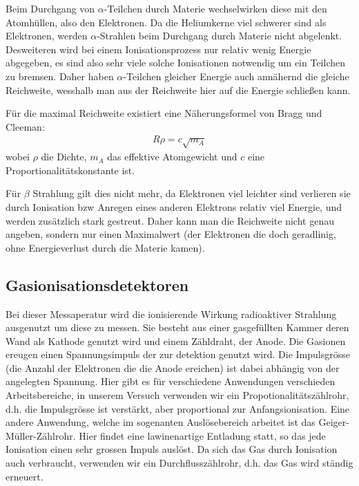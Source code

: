 \documentclass[12pt]{article}
\begin{document}
Beim Durchgang von $\alpha$-Teilchen durch Materie wechselwirken diese mit den Atomhüllen, also den Elektronen. Da die Heliumkerne viel schwerer sind als Elektronen, werden $\alpha$-Strahlen beim Durchgang durch Materie nicht abgelenkt. Desweiteren wird bei einem Ionisationsprozess nur relativ wenig Energie abgegeben, es sind also sehr viele solche Ionisationen notwendig um ein Teilchen zu bremsen. Daher haben $\alpha$-Teilchen gleicher Energie auch annähernd die gleiche Reichweite, wesshalb man aus der Reichweite hier auf die Energie schließen kann. 

Für die maximal Reichweite existiert eine Näherungsformel von Bragg und Cleeman: 
\begin{align}
 \label{cleeman} R \rho=c\sqrt{m_A}
\end{align}
wobei $\rho$ die Dichte, $m_A$ das effektive Atomgewicht und $c$ eine Proportionalitätskonstante ist.

Für $\beta$ Strahlung gilt dies nicht mehr, da Elektronen viel leichter sind verlieren sie durch Ionisation bzw Anregen eines anderen Elektrons relativ viel Energie, und werden zusätzlich stark gestreut. Daher kann man die Reichweite nicht genau angeben, sondern nur einen Maximalwert (der Elektronen die doch geradlinig, ohne Energieverlust durch die Materie kamen).


\subsection{Gasionisationsdetektoren}

Bei dieser Messaperatur wird die ionisierende Wirkung radioaktiver Strahlung ausgenutzt um diese zu messen. Sie besteht aus einer gasgefüllten Kammer deren Wand als Kathode genutzt wird und einem Zähldraht, der Anode. Die Gasionen ereugen einen Spannungsimpuls der zur detektion genutzt wird. Die Impulsgrösse (die Anzahl der Elektronen die die Anode ereichen) ist dabei abhängig von der angelegten Spannung. Hier gibt es für verschiedene Anwendungen verschieden Arbeitsbereiche, in unserem Versuch verwenden wir ein Propotionalitätszählrohr, d.h. die Impulsgrösse ist verstärkt, aber proportional zur Anfangsionisation. Eine andere Anwendung, welche im sogenanten Auslösebereich arbeitet ist das Geiger-Müller-Zählrohr. Hier findet eine lawinenartige Entladung statt, so das jede Ionisation einen sehr grossen Impuls auslöst. Da sich das Gas durch Ionisation auch verbraucht, verwenden wir ein Durchflusszählrohr, d.h. das Gas wird ständig erneuert.
\end{document}
